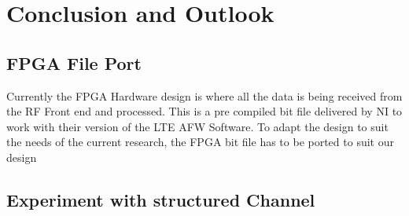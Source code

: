 \chapter{Conclusion and Outlook}\label{ch:conOutlook}

\section{FPGA File Port}\label{sec:FPGAChange}
Currently the FPGA Hardware design is where all the data is being received from the RF Front end and processed. This is a pre compiled bit file delivered by NI to work with their version of the LTE AFW Software. To adapt the design to suit the needs of the current research, the FPGA bit file has to be ported to suit our design 


\section{Experiment with structured Channel}\label{sec:StrucChannel}

